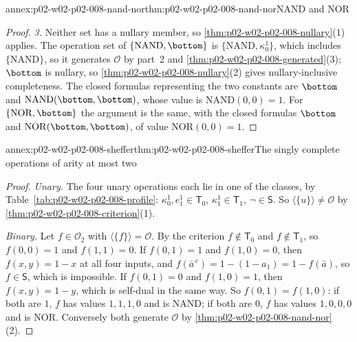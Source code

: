 \begin{annexitem}{annex:p02-w02-p02-008-nand-nor}{thm:p02-w02-p02-008-nand-nor}{NAND and NOR}
\begin{proof}
\emph{3.}  Neither set has a nullary member, so
\cref{thm:p02-w02-p02-008-nullary}(1) applies.  The operation set of
\(\{\mathrm{NAND},\bottom\}\) is \(\{\mathrm{NAND},\kappa^1_0\}\), which
includes \(\{\mathrm{NAND}\}\), so it generates \(\mathcal O\) by part~2 and
\cref{thm:p02-w02-p02-008-generated}(3); \(\bottom\) is nullary, so
\cref{thm:p02-w02-p02-008-nullary}(2) gives nullary-inclusive completeness.
The closed formulas representing the two constants are \(\bottom\) and
\(\mathrm{NAND}(\bottom,\bottom)\), whose value is \(\mathrm{NAND}(0,0)=1\).
For \(\{\mathrm{NOR},\bottom\}\) the argument is the same, with the closed
formulas \(\bottom\) and \(\mathrm{NOR}(\bottom,\bottom)\), of value
\(\mathrm{NOR}(0,0)=1\).
\end{proof}
\end{annexitem}

\begin{annexitem}{annex:p02-w02-p02-008-sheffer}{thm:p02-w02-p02-008-sheffer}{The singly complete operations of arity at most two}
\begin{proof}
\emph{Unary.}  The four unary operations each lie in one of the classes, by
Table~\ref{tab:p02-w02-p02-008-profile}: \(\kappa^1_0,e^1_1\in\mathsf T_0\),
\(\kappa^1_1\in\mathsf T_1\), \(\neg\in\mathsf S\).  So
\(\langle\{u\}\rangle\neq\mathcal O\) by
\cref{thm:p02-w02-p02-008-criterion}(1).

\emph{Binary.}  Let \(f\in\mathcal O_2\) with
\(\langle\{f\}\rangle=\mathcal O\).  By the criterion \(f\notin\mathsf T_0\)
and \(f\notin\mathsf T_1\), so \(f(0,0)=1\) and \(f(1,1)=0\).  If
\(f(0,1)=1\) and \(f(1,0)=0\), then \(f(x,y)=1-x\) at all four inputs, and
\(f(\bar a^{\,c})=1-(1-a_1)=1-f(\bar a)\), so \(f\in\mathsf S\), which is
impossible.  If \(f(0,1)=0\) and \(f(1,0)=1\), then \(f(x,y)=1-y\), which is
self-dual in the same way.  So \(f(0,1)=f(1,0)\): if both are \(1\), \(f\)
has values \(1,1,1,0\) and is \(\mathrm{NAND}\); if both are \(0\), \(f\) has
values \(1,0,0,0\) and is \(\mathrm{NOR}\).  Conversely both generate
\(\mathcal O\) by \cref{thm:p02-w02-p02-008-nand-nor}(2).
\end{proof}
\end{annexitem}

